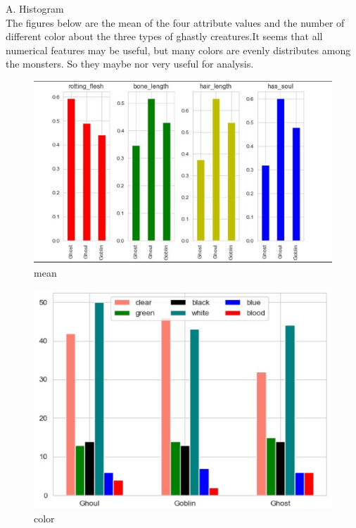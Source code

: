 \hspace*{0.4cm}A. Histogram\\
\hspace*{0.4cm}The figures below are the mean of the four attribute values  and the number of different color about the three types of ghastly creatures.It seems that all numerical features may be useful, but many colors are evenly distributes among the monsters. So they maybe nor very useful for analysis.\\
\begin{figure}[htbp]\centering
	\includegraphics[scale=0.3]{2.eps}
	\caption{mean}
\end{figure}
\begin{figure}[htbp]\centering
	\includegraphics[scale=0.3]{3.eps}
	\caption{color}
\end{figure}


